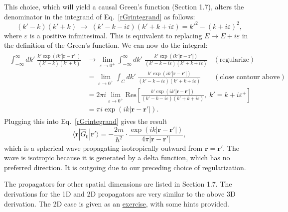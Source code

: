 \documentclass[pra,12pt]{revtex4}
\begin{document}
\noindent
This choice, which will yield a causal Green's function (Section 1.7),
alters the denominator in the integrand of Eq.~\eqref{rGrintegrand} as
follows:
\begin{equation}
  (k' - k)(k'+k) \;\rightarrow\; (k' - k - i\varepsilon)(k'+k+i\varepsilon) = {k'}^2 - (k+i\varepsilon)^2,
\end{equation}
where $\varepsilon$ is a positive infinitesimal.  This is equivalent
to replacing $E \rightarrow E + i\varepsilon$ in the definition of the
Green's function.  We can now do the integral:
\begin{align*}
  \begin{aligned}\int_{-\infty}^\infty dk' \; \frac{\displaystyle k' \exp\left(ik'|\mathbf{r}-\mathbf{r}'|\right)}{(k' - k)(k'+k)} &\rightarrow \lim_{\varepsilon \rightarrow 0^+} \int_{-\infty}^\infty dk' \; \frac{\displaystyle k' \exp\left(ik'|\mathbf{r}-\mathbf{r}'|\right)}{(k' - k - i\varepsilon)(k'+k+i\varepsilon)}\;\;\; (\text{regularize}) \\ &= \lim_{\varepsilon \rightarrow 0^+} \int_C dk' \; \frac{\displaystyle k' \exp\left(ik'|\mathbf{r}-\mathbf{r}'|\right)}{(k' - k - i\varepsilon)(k'+k+i\varepsilon)} \quad\;\;\; (\text{close contour above}) \\ &= 2\pi i \lim_{\varepsilon \rightarrow 0^+} \mathrm{Res}\left[\frac{\displaystyle k' \exp\left(ik'|\mathbf{r}-\mathbf{r}'|\right)}{(k' - k - i\varepsilon)(k'+k+i\varepsilon)}, \;k'=k+i\varepsilon^+\right] \\ &= \pi i \exp\left(ik|\mathbf{r}-\mathbf{r}'|\right).\end{aligned}
\end{align*}
Plugging this into Eq.~\eqref{rGrintegrand} gives the result
\begin{equation}
  \langle\mathbf{r}|\hat{G}_0|\mathbf{r}'\rangle = -\frac{2m}{\hbar^2}
  \cdot \frac{\exp\left(ik|\mathbf{r}-\mathbf{r}'|\right)}{4\pi|\mathbf{r}-\mathbf{r}'|},
\end{equation}
which is a spherical wave propagating isotropically outward from
$\mathbf{r} = \mathbf{r}'$.  The wave is isotropic because it is
generated by a delta function, which has no preferred direction.  It
is outgoing due to our preceding choice of regularization.

The propagators for other spatial dimensions are listed in Section
1.7.  The derivations for the 1D and 2D propagators are very similar
to the above 3D derivation.  The 2D case is given as an
\hyperref[ex:2dpropagator]{exercise}, with some hints provided.
\end{document}
